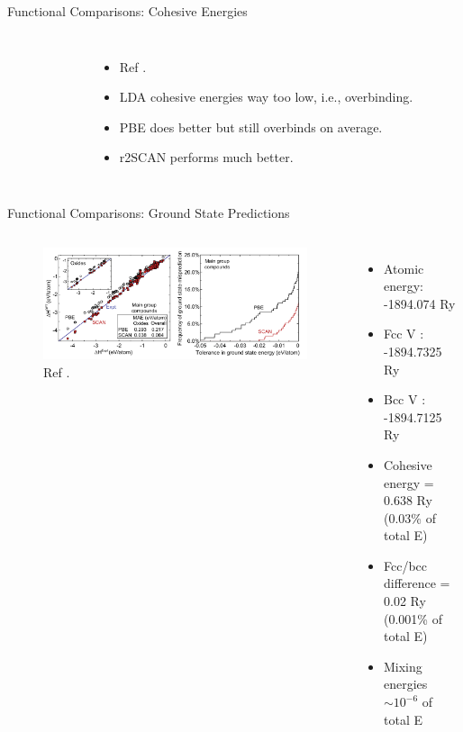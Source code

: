 \documentclass[aspectratio=169]{beamer}
\begin{document}
\begin{frame}{Functional Comparisons: Cohesive Energies}
\begin{columns}
\begin{figure}
            \end{figure}
            \begin{itemize}
                \item Ref \cite{liuAssessingR2SCANMetaGGA2024}.
                \item LDA cohesive energies way too low, i.e., overbinding.
                \item PBE does better but still overbinds on average.
                \item r2SCAN performs much better.
            \end{itemize}
        \end{columns}
    \end{frame}


    \begin{frame}{Functional Comparisons: Ground State Predictions}
        \begin{columns}
            \begin{figure}
                \centering
                \includegraphics[width=\linewidth]{lectures/figures/6_ground_states.png}
                \caption{Ref \cite{zhangEfficientFirstprinciplesPrediction2017}.}
            \end{figure}
            \begin{itemize}
                \item Atomic energy: -1894.074 Ry
                \item Fcc V : -1894.7325 Ry
                \item Bcc V : -1894.7125 Ry
                \item Cohesive energy = 0.638 Ry (0.03\% of total E)
                \item Fcc/bcc difference = 0.02 Ry (0.001\% of total E)
                \item Mixing energies $\sim 10^{-6}$ of total E
            \end{itemize}
        \end{columns}

    \end{frame}
\end{document}
